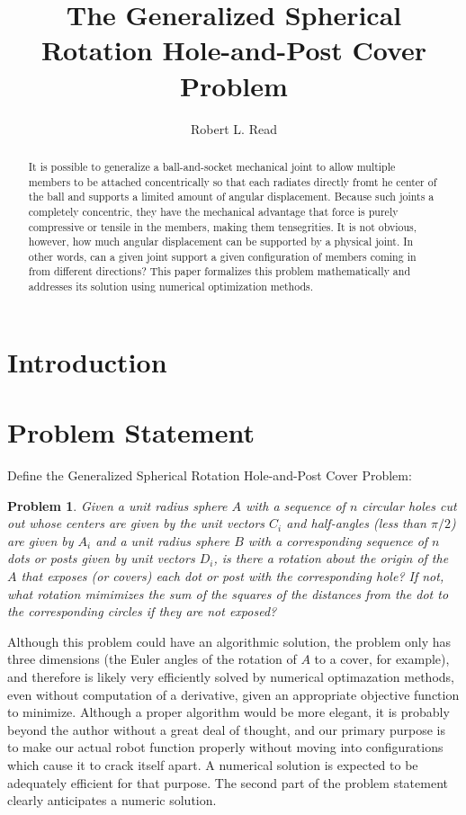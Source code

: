\documentclass{article}
\newtheorem{problem}{Problem}
\begin{document}
\title{The Generalized Spherical Rotation Hole-and-Post Cover Problem}
\author{Robert L. Read}

\maketitle

\begin{abstract}
  It is possible to generalize a ball-and-socket mechanical joint
  to allow multiple members to be attached concentrically so that
  each radiates directly fromt he center of the ball and supports
  a limited amount of angular displacement. Because such joints
  a completely concentric, they have the mechanical advantage that
  force is purely compressive or tensile in the members, making them
  tensegrities.  It is not obvious, however, how much angular displacement
  can be supported by a physical joint. In other words, can a given joint
  support a given configuration of members coming in from different directions?
  This paper formalizes this problem mathematically and addresses its
  solution using numerical optimization methods.

\end{abstract}

\section{Introduction}


\section{Problem Statement}
  Define the Generalized Spherical Rotation Hole-and-Post Cover Problem:

  \begin{problem}
  Given a unit radius sphere $A$ with a sequence of $n$ circular holes
  cut out whose centers are given by the unit vectors $C_i$ and
  half-angles (less than $\pi/2$) are given by $A_i$ and
  a unit radius sphere $B$ with a corresponding sequence of $n$ dots or posts
  given by unit vectors $D_i$, is there a rotation about the origin
  of the $A$ that exposes (or covers) each dot or post with the corresponding
  hole? If not, what rotation mimimizes the sum of the squares of the
  distances from the dot to the corresponding circles if they are not
  exposed?
  \end{problem}

  Although this problem could have an algorithmic solution,
  the problem only has three dimensions (the Euler angles of the rotation of
  $A$ to a cover, for example), and therefore is likely very efficiently
  solved by numerical optimazation methods, even without computation of
  a derivative, given an appropriate objective function to minimize.
  Although a proper algorithm would be more elegant, it is probably beyond
  the author without a great deal of thought, and our primary purpose
  is to make our actual robot function properly without moving into
  configurations which cause it to crack itself apart. A numerical
  solution is expected to be adequately efficient for that purpose.
  The second part of the problem statement clearly anticipates a numeric
  solution.
\end{document}
